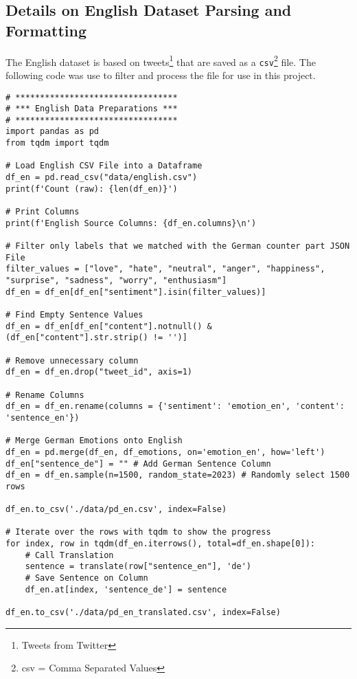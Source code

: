 \subsection{Details on English Dataset Parsing and Formatting}
\label{appendix:dataset_english}
The English dataset is based on tweets\footnote{Tweets from Twitter} that are saved as a \texttt{csv}\footnote{csv = Comma Separated Values} file. The following code was use to filter and process the file for use in this project.
\begin{verbatim}
# *********************************
# *** English Data Preparations ***
# *********************************
import pandas as pd
from tqdm import tqdm

# Load English CSV File into a Dataframe
df_en = pd.read_csv("data/english.csv")
print(f'Count (raw): {len(df_en)}')

# Print Columns
print(f'English Source Columns: {df_en.columns}\n')

# Filter only labels that we matched with the German counter part JSON File
filter_values = ["love", "hate", "neutral", "anger", "happiness", "surprise", "sadness", "worry", "enthusiasm"]
df_en = df_en[df_en["sentiment"].isin(filter_values)]

# Find Empty Sentence Values
df_en = df_en[df_en["content"].notnull() & (df_en["content"].str.strip() != '')]

# Remove unnecessary column
df_en = df_en.drop("tweet_id", axis=1)

# Rename Columns
df_en = df_en.rename(columns = {'sentiment': 'emotion_en', 'content': 'sentence_en'})

# Merge German Emotions onto English
df_en = pd.merge(df_en, df_emotions, on='emotion_en', how='left')
df_en["sentence_de"] = "" # Add German Sentence Column
df_en = df_en.sample(n=1500, random_state=2023) # Randomly select 1500 rows

df_en.to_csv('./data/pd_en.csv', index=False)

# Iterate over the rows with tqdm to show the progress
for index, row in tqdm(df_en.iterrows(), total=df_en.shape[0]):
    # Call Translation
    sentence = translate(row["sentence_en"], 'de')
    # Save Sentence on Column
    df_en.at[index, 'sentence_de'] = sentence

df_en.to_csv('./data/pd_en_translated.csv', index=False)
\end{verbatim}
\clearpage

